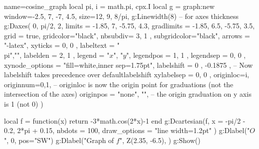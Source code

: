 \documentclass{standalone}
\begin{document}
\begin{luadraw}{name=cosine_graph}
    local pi, i = math.pi, cpx.I
    local g = graph:new{
        window={-2.5, 7, -7, 4.5}, size={12, 9, 8/pi},
    }
    g:Linewidth(8) -- for axes thickness
    g:Daxes(
        {0, pi/2, 2}, 
        {
            limits = {{-1.85, 7}, {-5.75, 4.3}},
            gradlimits = {{-1.85, 6.5}, {-5.75, 3.5}},
            grid = true, gridcolor="black", 
            nbsubdiv={ 3, 1 }, subgridcolor="black",
            arrows = "-latex",
            xyticks = { 0, 0 },
            labeltext = {"\\pi",""},
            labelden = { 2, 1 },
            legend = {"$x$", "$y$"},
            legendpos = { 1, 1 },
            legendsep = { 0, 0 },
            xynode_options = "fill=white,inner sep=1.75pt",
            labelshift = { 0 , -0.1875 }, -- Now labelshift takes precedence over defaultlabelshift
            xylabelsep = { 0, 0 },
            originloc=i, originnum={0,1}, -- originloc is now the origin point for graduations (not the intersection of the axes)
            originpos = {"none", ""}, -- the origin graduation on y axis is 1 (not 0)
        }
    )

    local f = function(x) return -3*math.cos(2*x)-1 end
    g:Dcartesian(f, {
        x = {-pi/2 - 0.2, 2*pi + 0.15},
        nbdots = 100, draw_options = "line width=1.2pt"
    })
    g:Dlabel("$O$", 0, {pos="SW"})
    g:Dlabel("Graph of $f$", Z(2.35, -6.5), {})
    g:Show()
\end{luadraw}
\end{document}
